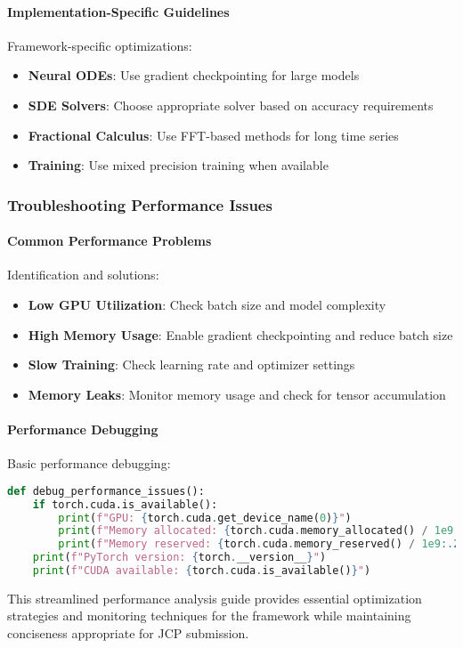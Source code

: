 \paragraph{Implementation-Specific Guidelines}
Framework-specific optimizations:
\begin{itemize}
    \item \textbf{Neural ODEs}: Use gradient checkpointing for large models
    \item \textbf{SDE Solvers}: Choose appropriate solver based on accuracy requirements
    \item \textbf{Fractional Calculus}: Use FFT-based methods for long time series
    \item \textbf{Training}: Use mixed precision training when available
\end{itemize}

\subsubsection{Troubleshooting Performance Issues}

\paragraph{Common Performance Problems}
Identification and solutions:
\begin{itemize}
    \item \textbf{Low GPU Utilization}: Check batch size and model complexity
    \item \textbf{High Memory Usage}: Enable gradient checkpointing and reduce batch size
    \item \textbf{Slow Training}: Check learning rate and optimizer settings
    \item \textbf{Memory Leaks}: Monitor memory usage and check for tensor accumulation
\end{itemize}

\paragraph{Performance Debugging}
Basic performance debugging:

\begin{lstlisting}[language=python, caption=Performance Debugging]
def debug_performance_issues():
    if torch.cuda.is_available():
        print(f"GPU: {torch.cuda.get_device_name(0)}")
        print(f"Memory allocated: {torch.cuda.memory_allocated() / 1e9:.2f} GB")
        print(f"Memory reserved: {torch.cuda.memory_reserved() / 1e9:.2f} GB")
    print(f"PyTorch version: {torch.__version__}")
    print(f"CUDA available: {torch.cuda.is_available()}")
\end{lstlisting}

This streamlined performance analysis guide provides essential optimization strategies and monitoring techniques for the \hpfracc framework while maintaining conciseness appropriate for JCP submission.